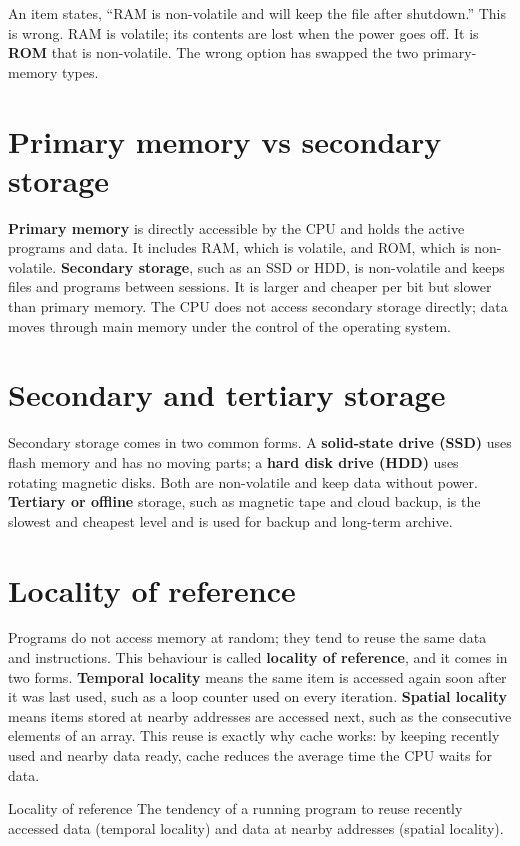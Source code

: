 \begin{example}
An item states, ``RAM is non-volatile and will keep the file after
shutdown.'' This is wrong. RAM is volatile; its contents are lost when the
power goes off. It is \textbf{ROM} that is non-volatile. The wrong option has
swapped the two primary-memory types.
\end{example}

\section{Primary memory vs secondary storage}
\textbf{Primary memory} is directly accessible by the CPU and holds the
active programs and data. It includes RAM, which is volatile, and ROM, which
is non-volatile. \textbf{Secondary storage}, such as an SSD or HDD, is
non-volatile and keeps files and programs between sessions. It is larger and
cheaper per bit but slower than primary memory. The CPU does not access
secondary storage directly; data moves through main memory under the control
of the operating system.

\section{Secondary and tertiary storage}
Secondary storage comes in two common forms. A \textbf{solid-state drive
(SSD)} uses flash memory and has no moving parts; a \textbf{hard disk drive
(HDD)} uses rotating magnetic disks. Both are non-volatile and keep data
without power. \textbf{Tertiary or offline} storage, such as magnetic tape
and cloud backup, is the slowest and cheapest level and is used for backup
and long-term archive.

\section{Locality of reference}
Programs do not access memory at random; they tend to reuse the same data
and instructions. This behaviour is called \textbf{locality of reference},
and it comes in two forms. \textbf{Temporal locality} means the same item is
accessed again soon after it was last used, such as a loop counter used on
every iteration. \textbf{Spatial locality} means items stored at nearby
addresses are accessed next, such as the consecutive elements of an array.
This reuse is exactly why cache works: by keeping recently used and nearby
data ready, cache reduces the average time the CPU waits for data.

\begin{definitionbox}{Locality of reference}
The tendency of a running program to reuse recently accessed data
(temporal locality) and data at nearby addresses (spatial locality).
\end{definitionbox}


